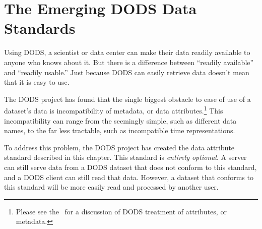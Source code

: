 %
%
%
%
%
%
%

\newcommand{\iso}[3]{This corresponds to the ISO Z39.50 GeoProfile
  element \emph{#1}, value \emph{#2}, SGML tag \lit{#3}.}

\chapter{The Emerging DODS Data Standards}
\label{dods-standard}

Using DODS, a scientist or data center can make their data readily
available to anyone who knows about it.  But there is a difference
between ``readily available'' and ``readily usable.''  Just because
DODS can easily retrieve data doesn't mean that it is easy to use.

The DODS project has found that the single biggest obstacle to ease of
use of a dataset's data is incompatibility of metadata, or data
attributes.\footnote{Please see the \DODSuser\ for a discussion of
  DODS treatment of attributes, or metadata.}  This incompatibility
can range from the seemingly simple, such as different data names, to
the far less tractable, such as incompatible time representations.

To address this problem, the DODS project has created the data
attribute standard described in this chapter.  This standard is
\emph{entirely optional}.  A server can still serve data from a DODS
dataset that does not conform to this standard, and a DODS client can
still read that data.  However, a dataset that conforms to this
standard will be more easily read and processed by another user.


